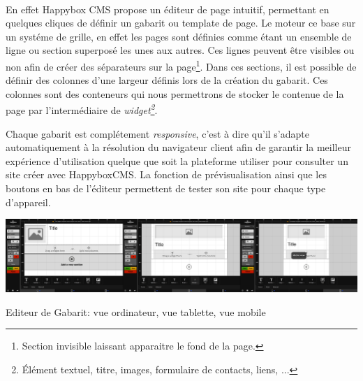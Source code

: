 \documentclass[11pt, a4paper ]{article}
\begin{document}
\paragraph{}
En effet Happybox CMS propose un éditeur de page intuitif, permettant en quelques cliques de définir un gabarit ou template de page. Le moteur ce base sur un systéme de grille, en effet les pages sont définies comme étant un ensemble de ligne ou section superposé les unes aux autres. Ces lignes peuvent être visibles ou non afin de créer des séparateurs sur la page\footnote{Section invisible laissant apparaitre le fond de la page.}. Dans ces sections, il est possible de définir des colonnes d'une largeur définis lors de la création du gabarit. Ces colonnes sont des conteneurs qui nous permettrons de stocker le contenue de la page par l'intermédiaire de \emph{widget\footnote{Élément textuel, titre, images, formulaire de contacts, liens, ...}}.

Chaque gabarit est complétement \emph{responsive}, c'est à dire qu'il s'adapte automatiquement à la résolution du navigateur client afin de garantir la meilleur expérience d'utilisation quelque que soit la plateforme utiliser pour consulter un site créer avec HappyboxCMS. La fonction de prévisualisation ainsi que les boutons en bas de l'éditeur permettent de tester son site pour chaque type d'appareil.


\begin{center}

		\includegraphics[width=\textwidth]{images/HBscreen/editeurGabarit.png}
		\caption{Editeur de Gabarit: vue ordinateur, vue tablette, vue mobile}

\end{center}
\end{document}
